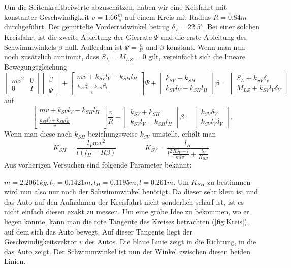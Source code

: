 Um die Seitenkraftbeiwerte abzuschätzen, haben wir eine Keisfahrt mit konstanter Geschwindigkeit $v=1.66\frac{m}{s}$ auf einem Kreis mit Radius $R=0.84m$ durchgeführt. Der gemittelte Vorderradwinkel betrug $\delta_V=22.5^\circ$. Bei einer solchen Kreisfahrt ist die zweite Ableitung der Gierrate $\ddot{\Psi}$ und die erste Ableitung des Schwimmwinkels $ \beta$ null. Außerdem ist $\dot{\Psi}=\frac{v}{R}$ und $\beta$ konstant. Wenn man nun noch zusätzlich annimmt, dass $S_L=M_{LZ}=0$ gilt, vereinfacht sich die lineare Bewegungsgleichung
$$ \begin{bmatrix} 
mv^2 & 0 \\
0 & I 
\end{bmatrix} 
\begin{bmatrix} 
\dot{\beta} \\
\ddot{\Psi}
\end{bmatrix}+ 
\begin{bmatrix} 
mv+k_{SV}l_V-k_{SH}l_{H} \\
\frac{k_{SV}l_V^2+k_{SH}l_H^2}{v}  
\end{bmatrix} \dot{\Psi}+
\begin{bmatrix} 
k_{SV}+k_{SH} \\
k_{SV}l_V-k_{SH}l_H 
\end{bmatrix} \beta=
\begin{bmatrix} 
S_L+k_{SV}\delta_v \\
M_{LZ}+k_{SV}l_V\delta_V 
\end{bmatrix}
$$
auf 
$$  
\begin{bmatrix} 
mv+k_{SV}l_V-k_{SH}l_{H} \\
\frac{k_{SV}l_V^2+k_{SH}l_H^2}{v}  
\end{bmatrix} \frac{v}{R}+
\begin{bmatrix} 
k_{SV}+k_{SH} \\
k_{SV}l_V-k_{SH}l_H 
\end{bmatrix} \beta=
\begin{bmatrix} 
k_{SV}\delta_V \\
k_{SV}l_V\delta_V 
\end{bmatrix}.
$$
Wenn man diese nach $k_{SH}$ beziehungsweise $k_{SV}$ umstellt, erhält man 
$$
K_{SH}=\frac{l_V mv^2}{l(l_H-R\beta)} \qquad \qquad K_{SV}=\frac{l_H}{l^2\frac{R\delta_V-l}{mlv^2}+\frac{l_V}{K_{SH}}}.
$$
Aus vorherigen Versuchen sind folgende Parameter bekannt:

$m=2.2061 kg,l_V=0.1421 m,l_H=0.1195 m,l=0.261 m$. Um $K_{SH}$ zu bestimmen wird nun also nur noch der Schwimmwinkel benötigt. Da dieser sehr klein ist und das Auto auf den Aufnahmen der Kreisfahrt nicht sonderlich scharf ist, ist es nicht einfach diesen exakt zu messen. Um eine grobe Idee zu bekommen, wo er liegen könnte, kann man die rote Tangente des Kreises betrachten (\ref{fig:Kreis}), auf dem sich das Auto bewegt. Auf dieser Tangente liegt der Geschwindigkeitsvektor $v$ des Autos. Die blaue Linie zeigt in die Richtung, in die das Auto zeigt. Der Schwimmwinkel ist nun der Winkel zwischen diesen beiden Linien. 

